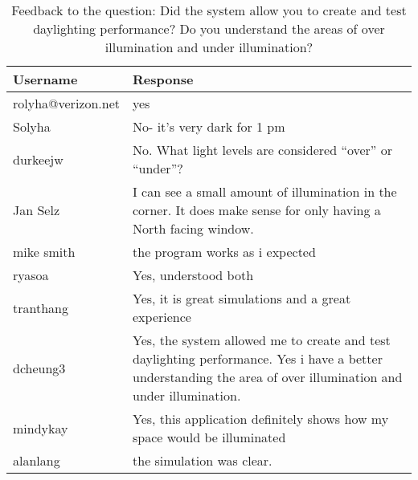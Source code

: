 \begin{table}[h]
\centering
\begin{tabular}{|p{}|p{}|}
\hline
\rowcolor[HTML]{EFEFEF} 
\textbf{Username} & \textbf{Response} \\ \hline
rolyha@verizon.net & yes \\ \hline
Solyha & No- it's very dark for 1 pm \\ \hline
durkeejw & No. What light levels are considered ``over'' or ``under''? \\ \hline
Jan Selz & I can see a small amount of illumination in the corner.  It does make sense for only having a North facing window. \\ \hline
mike smith & the program works as i expected \\ \hline
ryasoa & Yes, understood both \\ \hline
tranthang & Yes, it is great simulations and a great experience \\ \hline
dcheung3 & Yes, the system allowed me to create and test daylighting performance. Yes i have a better understanding the area of over illumination and under illumination. \\ \hline
mindykay & Yes, this application definitely shows how my space would be illuminated \\ \hline
alanlang & the simulation was clear. \\ \hline
\end{tabular}
\caption{Feedback to the question: Did the system allow you to create and test daylighting performance? Do you understand the areas of over illumination and under illumination?}
\label{fig:effective}
\end{table}

































